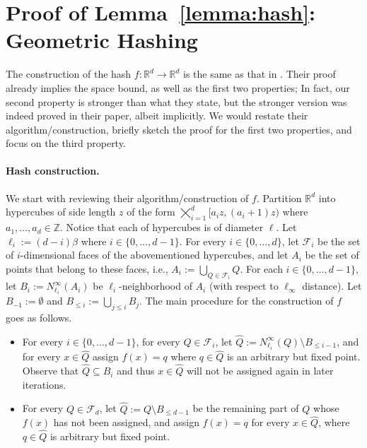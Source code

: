 \documentclass[11pt,letterpaper]{article}
\theoremstyle{plain}
\theoremstyle{definition}
\theoremstyle{remark}
\def\ZZ{{\mathbb{Z}}}
\begin{document}
\appendix


    \section{Proof of Lemma~\ref{lemma:hash}: Geometric Hashing}
\label{sec:proof_hashing}

\lemmahash*

The construction of the hash $f: \mathbb{R}^{d}\to \mathbb{R}^{d}$ is the same as that  in \cite[Theorem 5.3]{arxiv.2204.02095}.
Their proof already implies the space bound, as well as the first two properties;
In fact, our second property is stronger than what they state, 
but the stronger version was indeed proved in their paper, albeit implicitly.
We would restate their algorithm/construction, briefly sketch the proof for the first two properties,  and focus on the third property.

\paragraph{Hash construction.}
We start with reviewing their algorithm/construction of $f$.
Partition $\mathbb{R}^{d}$ into hypercubes of side length $z$ of the form $\bigtimes_{i = 1}^d [a_i z, (a_i+1)z)$ where $a_1, \ldots, a_d \in \ZZ$. 
Notice that each of hypercubes is of diameter $\ell$. 
Let $\ell_{i}:= (d-i)\beta$ where $i\in\{0, \ldots, d-1\}$. 
For every $i\in\{0, \ldots, d\}$, let $\mathcal{F}_{i}$ be the set of $i$-dimensional faces of the abovementioned hypercubes,
and let $A_{i}$ be the set of points that belong to these faces, i.e., $A_i := \bigcup_{Q \in \mathcal{F}_i} Q$.
For each $i\in\{0, \ldots, d-1\}$, let $B_{i}:= N_{\ell_{i}}^{\infty}(A_{i})$ be $\ell_{i}$-neighborhood of $A_{i}$ (with respect to $\ell_\infty$ distance). 
Let $B_{-1}:= \emptyset$ and $B_{\leq i}:= \bigcup_{j\leq i}B_{j}$. 
The main procedure for the construction of $f$ goes as follows.
\begin{itemize}
\item For every $i\in\{0, \ldots, d-1\}$, for every $Q\in \mathcal{F}_{i}$, let $\widehat{Q} := N_{\ell_{i}}^{\infty}(Q)\setminus B_{\leq i-1}$, and for every $x\in\widehat{Q}$ assign $f(x)=q$ where $q\in\widehat{Q}$ is an arbitrary but fixed point. 
    Observe that $\widehat{Q}\subseteq B_{i}$ and thus $x\in\widehat{Q}$ will not be assigned again in later iterations. 
    \item For every $Q\in \mathcal{F}_{d}$, let $\widehat{Q} := Q\setminus B_{\leq d-1}$ be the remaining part of $Q$ whose $f(x)$ has not been assigned, and assign $f(x)=q$ for every $x\in\widehat{Q}$, where $q\in\widehat{Q}$ is arbitrary but fixed point. 
\end{itemize}  
\end{document}

